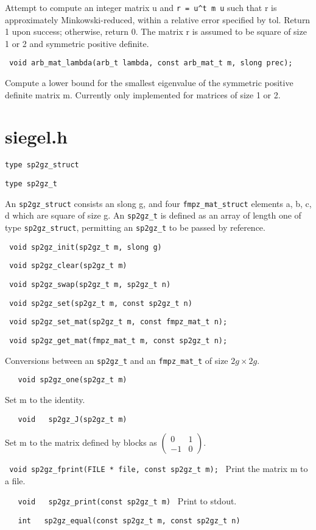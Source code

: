 \documentclass{article}
\newcommand{\code}[1]{\lstinline:#1:}
\newcommand{\fun}[1]{\vspace{2mm}\noindent \code{#1}}
\newcommand{\mat}[4]{\left(\begin{matrix}#1&#2\\#3&#4\end{matrix}\right)}
\begin{document}
Attempt to compute an integer matrix u and \code{r = u^t m u} such
that r is approximately Minkowski-reduced, within a relative error
specified by tol. Return 1 upon success; otherwise, return 0. The
matrix r is assumed to be square of size 1 or 2 and symmetric positive
definite.

\fun{
void
arb_mat_lambda(arb_t lambda, const arb_mat_t m, slong prec);
}

Compute a lower bound for the smallest eigenvalue of the symmetric
positive definite matrix m. Currently only implemented for matrices of
size 1 or 2.

\section{siegel.h}

\fun{type sp2gz_struct}

\fun{type sp2gz_t}

An \code{sp2gz_struct} consists an slong g, and four \code{fmpz_mat_struct}
elements a, b, c, d which are square of size g. An \code{sp2gz_t} is defined
as an array of length one of type \code{sp2gz_struct}, permitting an \code{sp2gz_t}
to be passed by reference.

\fun{
void
sp2gz_init(sp2gz_t m, slong g)
}

\fun{
void
sp2gz_clear(sp2gz_t m)
}

\fun{
void
sp2gz_swap(sp2gz_t m, sp2gz_t n)
}

\fun{
void
sp2gz_set(sp2gz_t m, const sp2gz_t n)
}

\fun{
void sp2gz_set_mat(sp2gz_t m, const fmpz_mat_t n);
}

\fun{
void sp2gz_get_mat(fmpz_mat_t m, const sp2gz_t n);
}

Conversions between an \code{sp2gz_t} and an \code{fmpz_mat_t} of size
$2g\times 2g$.

\fun{
  void
sp2gz_one(sp2gz_t m)
}

Set m to the identity.

\fun{
  void
  sp2gz_J(sp2gz_t m)
}

Set m to the matrix defined by blocks as $\mat{0}{1}{-1}{0}$.

\fun{
void sp2gz_fprint(FILE * file, const sp2gz_t m);
}
Print the matrix m to a file. 

\fun{
  void
  sp2gz_print(const sp2gz_t m)
}
Print to stdout.

\fun{
  int
  sp2gz_equal(const sp2gz_t m, const sp2gz_t n)
}
\end{document}
